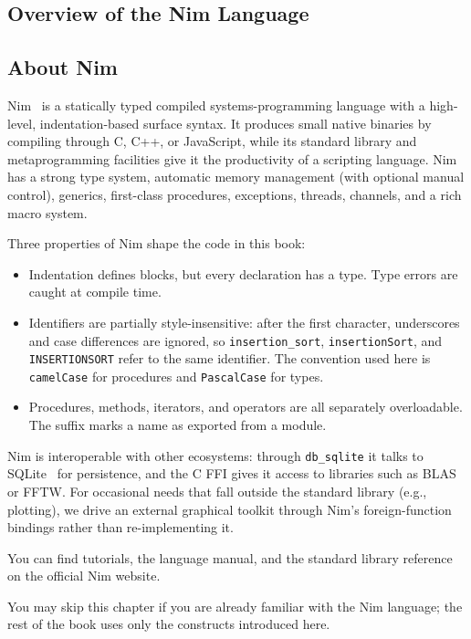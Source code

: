 \documentclass[justified, sixbynine]{tufte-book}
\def\ft{\small\tt}
\theoremstyle{plain}%
\newtheorem * {corollary}{Corollary}
\theoremstyle{definition}
\theoremstyle{remark}
\newtheorem * {remark}{Remark}
\newtheorem * {note}{Note}
\begin{document}
\begin{fullwidth}
\goodbreak\chapter{Overview of the Nim Language}


\goodbreak\section{About Nim}

Nim~\cite{nim} is a statically typed compiled systems-programming language with a high-level, indentation-based surface syntax. It produces small native binaries by compiling through C, C++, or JavaScript, while its standard library and metaprogramming facilities give it the productivity of a scripting language. Nim has a strong type system, automatic memory management (with optional manual control), generics, first-class procedures, exceptions, threads, channels, and a rich macro system.

Three properties of Nim shape the code in this book:
\begin{itemize}
\item Indentation defines blocks, but every declaration has a type. Type errors are caught at compile time.
\item Identifiers are partially style-insensitive: after the first character, underscores and case differences are ignored, so {\ft insertion\_sort}, {\ft insertionSort}, and {\ft INSERTIONSORT} refer to the same identifier. The convention used here is {\ft camelCase} for procedures and {\ft PascalCase} for types.
\item Procedures, methods, iterators, and operators are all separately overloadable. The {\ft *} suffix marks a name as exported from a module.
\end{itemize}

Nim is interoperable with other ecosystems: through {\ft db\_sqlite} it talks to SQLite~\cite{sqlite} for persistence, and the C FFI gives it access to libraries such as BLAS or FFTW. For occasional needs that fall outside the standard library (e.g., plotting), we drive an external graphical toolkit through Nim's foreign-function bindings rather than re-implementing it.

You can find tutorials, the language manual, and the standard library reference on the official Nim website.

You may skip this chapter if you are already familiar with the Nim language; the rest of the book uses only the constructs introduced here.


\end{fullwidth}
\end{document}
